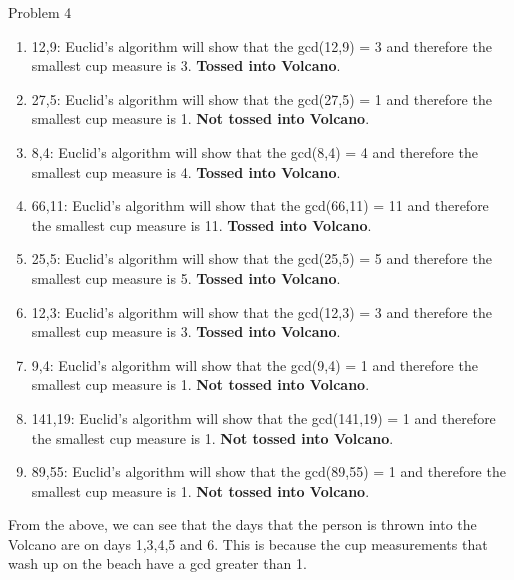 \begin{problem}{Problem 4}
    \begin{Highlight}[Solution]
        \begin{enumerate}
            \item 12,9: Euclid's algorithm will show that the gcd(12,9) = 3 and therefore the smallest cup measure is 3. \textbf{Tossed into Volcano}.
            \item 27,5: Euclid's algorithm will show that the gcd(27,5) = 1 and therefore the smallest cup measure is 1. \textbf{Not tossed into Volcano}.
            \item 8,4: Euclid's algorithm will show that the gcd(8,4) = 4 and therefore the smallest cup measure is 4. \textbf{Tossed into Volcano}.
            \item 66,11: Euclid's algorithm will show that the gcd(66,11) = 11 and therefore the smallest cup measure is 11. \textbf{Tossed into Volcano}.
            \item 25,5: Euclid's algorithm will show that the gcd(25,5) = 5 and therefore the smallest cup measure is 5. \textbf{Tossed into Volcano}.
            \item 12,3: Euclid's algorithm will show that the gcd(12,3) = 3 and therefore the smallest cup measure is 3. \textbf{Tossed into Volcano}.
            \item 9,4: Euclid's algorithm will show that the gcd(9,4) = 1 and therefore the smallest cup measure is 1. \textbf{Not tossed into Volcano}.
            \item 141,19: Euclid's algorithm will show that the gcd(141,19) = 1 and therefore the smallest cup measure is 1. \textbf{Not tossed into Volcano}.
            \item 89,55: Euclid's algorithm will show that the gcd(89,55) = 1 and therefore the smallest cup measure is 1. \textbf{Not tossed into Volcano}.
        \end{enumerate}

        From the above, we can see that the days that the person is thrown into the Volcano are on days 1,3,4,5 and 6. This is because the cup measurements that wash up on the beach have a gcd greater
        than 1.
    \end{Highlight}
\end{problem}

